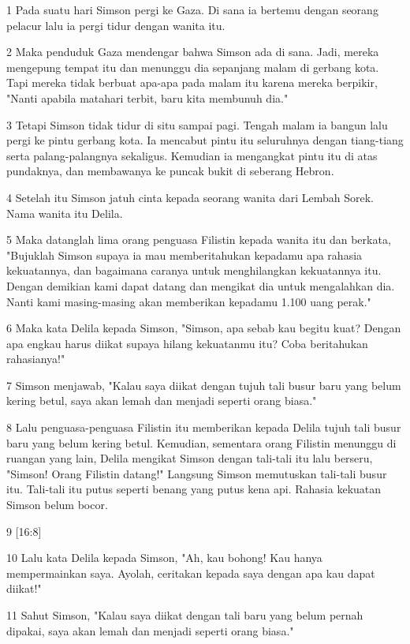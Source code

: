 \par 1 Pada suatu hari Simson pergi ke Gaza. Di sana ia bertemu dengan seorang pelacur lalu ia pergi tidur dengan wanita itu.
\par 2 Maka penduduk Gaza mendengar bahwa Simson ada di sana. Jadi, mereka mengepung tempat itu dan menunggu dia sepanjang malam di gerbang kota. Tapi mereka tidak berbuat apa-apa pada malam itu karena mereka berpikir, "Nanti apabila matahari terbit, baru kita membunuh dia."
\par 3 Tetapi Simson tidak tidur di situ sampai pagi. Tengah malam ia bangun lalu pergi ke pintu gerbang kota. Ia mencabut pintu itu seluruhnya dengan tiang-tiang serta palang-palangnya sekaligus. Kemudian ia mengangkat pintu itu di atas pundaknya, dan membawanya ke puncak bukit di seberang Hebron.
\par 4 Setelah itu Simson jatuh cinta kepada seorang wanita dari Lembah Sorek. Nama wanita itu Delila.
\par 5 Maka datanglah lima orang penguasa Filistin kepada wanita itu dan berkata, "Bujuklah Simson supaya ia mau memberitahukan kepadamu apa rahasia kekuatannya, dan bagaimana caranya untuk menghilangkan kekuatannya itu. Dengan demikian kami dapat datang dan mengikat dia untuk mengalahkan dia. Nanti kami masing-masing akan memberikan kepadamu 1.100 uang perak."
\par 6 Maka kata Delila kepada Simson, "Simson, apa sebab kau begitu kuat? Dengan apa engkau harus diikat supaya hilang kekuatanmu itu? Coba beritahukan rahasianya!"
\par 7 Simson menjawab, "Kalau saya diikat dengan tujuh tali busur baru yang belum kering betul, saya akan lemah dan menjadi seperti orang biasa."
\par 8 Lalu penguasa-penguasa Filistin itu memberikan kepada Delila tujuh tali busur baru yang belum kering betul. Kemudian, sementara orang Filistin menunggu di ruangan yang lain, Delila mengikat Simson dengan tali-tali itu lalu berseru, "Simson! Orang Filistin datang!" Langsung Simson memutuskan tali-tali busur itu. Tali-tali itu putus seperti benang yang putus kena api. Rahasia kekuatan Simson belum bocor.
\par 9 [16:8]
\par 10 Lalu kata Delila kepada Simson, "Ah, kau bohong! Kau hanya mempermainkan saya. Ayolah, ceritakan kepada saya dengan apa kau dapat diikat!"
\par 11 Sahut Simson, "Kalau saya diikat dengan tali baru yang belum pernah dipakai, saya akan lemah dan menjadi seperti orang biasa."
